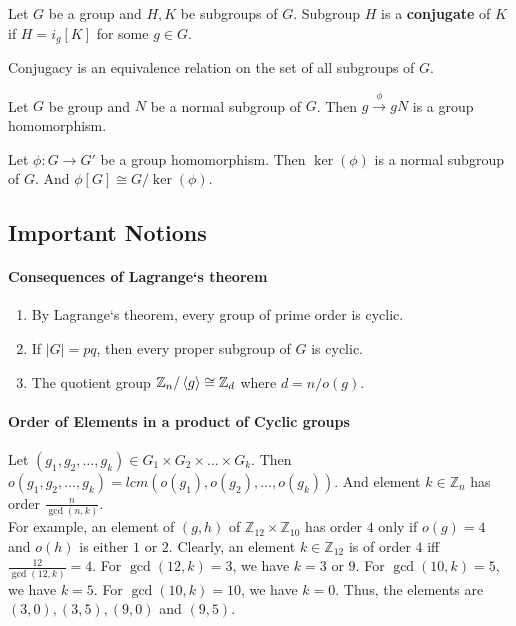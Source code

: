 \begin{definition}
	Let $G$ be a group and $H,K$ be subgroups of $G$.
	Subgroup $H$ is a \textbf{conjugate} of $K$ if $H = i_g[K]$ for some $g \in G$.
\end{definition}

	Conjugacy is an equivalence relation on the set of all subgroups of $G$.
\begin{theorem}
	Let $G$ be group and $N$ be a normal subgroup of $G$.
	Then $g \overset{\phi}{\to} gN$ is a group homomorphism.
\end{theorem}

\begin{theorem}
	Let $\phi : G \to G'$ be a group homomorphism.
	Then $\ker(\phi)$ is a normal subgroup of $G$.
	And $\phi[G] \cong G/\ker(\phi)$.
\end{theorem}

\subsection*{Important Notions}
\paragraph{Consequences of Lagrange`s theorem}
\begin{enumerate}
	\item By Lagrange`s theorem, every group of prime order is cyclic.
	\item If $|G|=pq$, then every proper subgroup of $G$ is cyclic.
	\item The quotient group $\mathbb{Z}_n/\left\langle g \right\rangle \cong \mathbb{Z}_d$ where $d = n/o(g)$.
\end{enumerate}
\paragraph{Order of Elements in a product of Cyclic groups}
	Let $(g_1,g_2,\dots,g_k) \in G_1 \times G_2 \times \dots \times G_k$. Then $o(g_1,g_2,\dots,g_k) = lcm(o(g_1),o(g_2),\dots,o(g_k))$. And element $k \in \mathbb{Z}_n$ has order $\frac{n}{\gcd(n,k)}$.\\

	For example, an element of $(g,h)$ of $\mathbb{Z}_{12} \times \mathbb{Z}_{10}$ has order $4$ only if $o(g)=4$ and $o(h)$ is either $1$ or $2$. Clearly, an element $k \in \mathbb{Z}_{12}$ is of order $4$ iff $\frac{12}{\gcd(12,k)}=4$. For $\gcd(12,k)=3$, we have $k = 3$ or $9$. For $\gcd(10,k)=5$, we have $k=5$. For $\gcd(10,k)=10$, we have $k=0$. Thus, the elements are $(3,0),(3,5),(9,0)$ and $(9,5)$.\\

